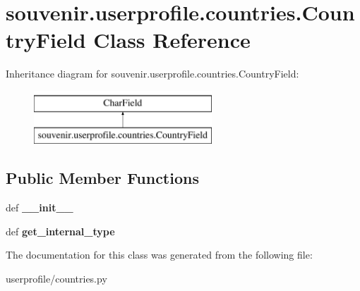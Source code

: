 \hypertarget{classsouvenir_1_1userprofile_1_1countries_1_1CountryField}{\section{souvenir.\-userprofile.\-countries.\-Country\-Field Class Reference}
\label{classsouvenir_1_1userprofile_1_1countries_1_1CountryField}
}
Inheritance diagram for souvenir.\-userprofile.\-countries.\-Country\-Field\-:\begin{figure}[H]
\begin{center}
\leavevmode
\includegraphics[height=2.000000cm]{classsouvenir_1_1userprofile_1_1countries_1_1CountryField}
\end{center}
\end{figure}
\subsection*{Public Member Functions}
\begin{DoxyCompactItemize}
\item 
\hypertarget{classsouvenir_1_1userprofile_1_1countries_1_1CountryField_ad98e73f2d83b344de9653331d2f09c72}{def {\bfseries \-\_\-\-\_\-init\-\_\-\-\_\-}}\label{classsouvenir_1_1userprofile_1_1countries_1_1CountryField_ad98e73f2d83b344de9653331d2f09c72}

\item 
\hypertarget{classsouvenir_1_1userprofile_1_1countries_1_1CountryField_a877a3893427a7b78420ce31a7452f0bf}{def {\bfseries get\-\_\-internal\-\_\-type}}\label{classsouvenir_1_1userprofile_1_1countries_1_1CountryField_a877a3893427a7b78420ce31a7452f0bf}

\end{DoxyCompactItemize}


The documentation for this class was generated from the following file\-:\begin{DoxyCompactItemize}
\item 
userprofile/countries.\-py\end{DoxyCompactItemize}
